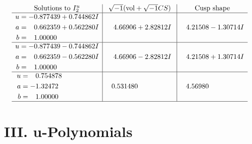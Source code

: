 \documentclass[1p]{elsarticle_modified}
\theoremstyle{definition}
\newcommand{\I}{\sqrt{-1}}
\begin{document}
$$\begin{array}{c|c|c}  
\text{Solutions to }I^u_{2}& \I (\text{vol} + \sqrt{-1}CS) & \text{Cusp shape}\\
 \hline 
\begin{aligned}
u &= -0.877439 + 0.744862 I \\
a &= \phantom{-}0.662359 + 0.562280 I \\
b &= \phantom{-}1.00000\phantom{ +0.000000I}\end{aligned}
 & \phantom{-}4.66906 + 2.82812 I & \phantom{-}4.21508 - 1.30714 I \\ \hline\begin{aligned}
u &= -0.877439 - 0.744862 I \\
a &= \phantom{-}0.662359 - 0.562280 I \\
b &= \phantom{-}1.00000\phantom{ +0.000000I}\end{aligned}
 & \phantom{-}4.66906 - 2.82812 I & \phantom{-}4.21508 + 1.30714 I \\ \hline\begin{aligned}
u &= \phantom{-}0.754878\phantom{ +0.000000I} \\
a &= -1.32472\phantom{ +0.000000I} \\
b &= \phantom{-}1.00000\phantom{ +0.000000I}\end{aligned}
 & \phantom{-}0.531480\phantom{ +0.000000I} & \phantom{-}4.56980\phantom{ +0.000000I}\\
 \hline 
 \end{array}$$\newpage
\newpage\renewcommand{\arraystretch}{1}
\centering \section*{ III. u-Polynomials}
\end{document}
